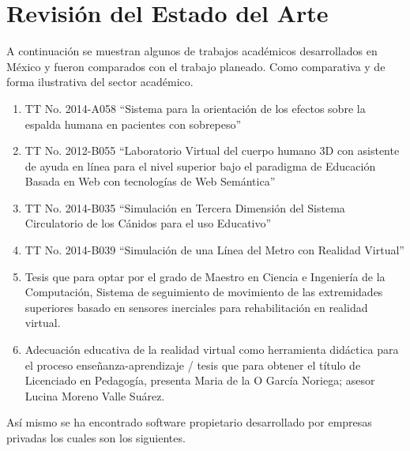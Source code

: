 \section{Revisión del Estado del Arte}
A continuación se muestran algunos de trabajos académicos desarrollados en México y fueron comparados con el trabajo planeado. 
Como comparativa y de forma ilustrativa del sector académico.\\
\newline
\begin{enumerate}
\item TT No. 2014-A058 “Sistema para la orientación de los efectos sobre la espalda humana en pacientes con sobrepeso”\cite{tt1}
\item TT No. 2012-B055 “Laboratorio Virtual del cuerpo humano 3D con asistente de ayuda en línea para el nivel superior bajo el paradigma de Educación Basada en Web con 
tecnologías de Web Semántica”\cite{tt2}
\item TT No. 2014-B035 “Simulación en Tercera Dimensión del Sistema Circulatorio de los Cánidos para el uso Educativo”\cite{tt3}
\item TT No. 2014-B039 “Simulación de una Línea del Metro con Realidad Virtual”\cite{tt4}
\item Tesis que para optar por el grado de Maestro en Ciencia e Ingeniería de la Computación, Sistema de seguimiento de movimiento de las extremidades superiores basado 
en sensores inerciales para rehabilitación en realidad virtual.\cite{mastersthesis1}
\item Adecuación educativa de la realidad virtual como herramienta didáctica para el proceso enseñanza-aprendizaje / tesis que para obtener el título de Licenciado en 
Pedagogía, presenta Maria de la O García Noriega; asesor Lucina Moreno Valle Suárez.\cite{te1}
\end{enumerate}
Así mismo se ha encontrado software propietario desarrollado por empresas privadas los cuales son los siguientes.\\
